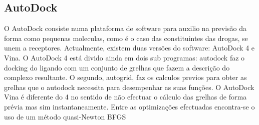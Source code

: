 \subsection {AutoDock}
O AutoDock \cite{autoDock} consiste numa plataforma de software para auxilio na previsão da forma como pequenas moleculas, como é o caso das constituintes das drogas, se unem a receptores.
Actualmente, existem duas versões do software: AutoDock 4 e Vina. O AutoDock 4 está divido ainda em dois sub programas: autodock faz o docking do ligando com um conjunto de grelhas que fazem a descrição do complexo resultante. O segundo, autogrid, faz os calculos previos para obter as grelhas que o autodock necessita para desempenhar as suas funções.  
O AutoDock Vina é diferente do 4 no sentido de não efectuar o cálculo das grelhas de forma prévia mas sim instantaneamente. Entre as optimizações efectuadas encontra-se o uso de um método quasi-Newton BFGS
\cite{autoDockVina}
%
%
